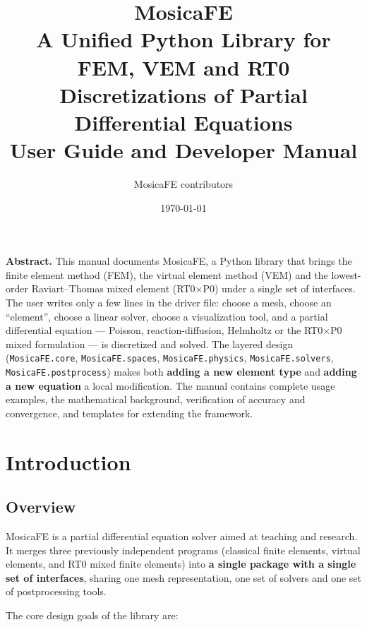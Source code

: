 \documentclass[11pt,oneside]{book}
\title{\Huge \textbf{MosicaFE}\\[0.4em]
       \Large A Unified Python Library for FEM, VEM and RT0\\
       \Large Discretizations of Partial Differential Equations\\[0.6em]
       \large User Guide and Developer Manual}
\author{\normalsize MosicaFE contributors}
\date{\normalsize \today}
\theoremstyle{definition}
\theoremstyle{plain}
\newcommand{\mosica}{\textsf{MosicaFE}}
\newcommand{\module}[1]{\texttt{MosicaFE.#1}}
\begin{document}
\frontmatter
\maketitle

\begin{center}
\begin{minipage}{0.86\textwidth}
\small
\textbf{Abstract.} This manual documents \mosica{}, a Python library that brings the
finite element method (FEM), the virtual element method (VEM) and the lowest-order
Raviart--Thomas mixed element (RT0$\times$P0) under a single set of interfaces.
The user writes only a few lines in the driver file: choose a mesh, choose an
``element'', choose a linear solver, choose a visualization tool, and a
partial differential equation --- Poisson, reaction-diffusion, Helmholtz or the
RT0$\times$P0 mixed formulation --- is discretized and solved. The layered design
(\module{core}, \module{spaces}, \module{physics}, \module{solvers},
\module{postprocess}) makes both \textbf{adding a new element type} and
\textbf{adding a new equation} a local modification. The manual contains complete
usage examples, the mathematical background, verification of accuracy and
convergence, and templates for extending the framework.
\end{minipage}
\end{center}

\vspace{1.0em}

\tableofcontents

\mainmatter

\chapter{Introduction}
\label{chap:intro}

\section{Overview}

\mosica{} is a partial differential equation solver aimed at teaching and research.
It merges three previously independent programs (classical finite elements, virtual
elements, and RT0 mixed finite elements) into \textbf{a single package with a single
set of interfaces}, sharing one mesh representation, one set of solvers and one set
of postprocessing tools.

The core design goals of the library are:
\end{document}
